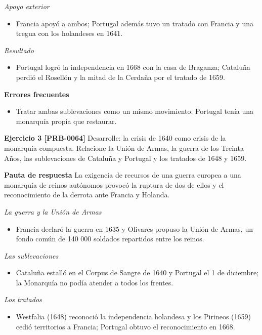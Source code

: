 \documentclass{book}
\begin{document}
\noindent\textit{Apoyo exterior}
\begin{itemize}
\item Francia apoyó a ambos; Portugal además tuvo un tratado con Francia y una tregua con los holandeses en 1641.
\end{itemize}

\noindent\textit{Resultado}
\begin{itemize}
\item Portugal logró la independencia en 1668 con la casa de Braganza; Cataluña perdió el Rosellón y la mitad de la Cerdaña por el tratado de 1659.
\end{itemize}

\noindent\textbf{Errores frecuentes}
\begin{itemize}
\item Tratar ambas sublevaciones como un mismo movimiento: Portugal tenía una monarquía propia que restaurar.
\end{itemize}

\noindent\textbf{Ejercicio 3 [PRB-0064]}
Desarrolle: la crisis de 1640 como crisis de la monarquía compuesta. Relacione la Unión de Armas, la guerra de los Treinta Años, las sublevaciones de Cataluña y Portugal y los tratados de 1648 y 1659.


\noindent\textbf{Pauta de respuesta}
La exigencia de recursos de una guerra europea a una monarquía de reinos autónomos provocó la ruptura de dos de ellos y el reconocimiento de la derrota ante Francia y Holanda.


\noindent\textit{La guerra y la Unión de Armas}
\begin{itemize}
\item Francia declaró la guerra en 1635 y Olivares propuso la Unión de Armas, un fondo común de 140 000 soldados repartidos entre los reinos.
\end{itemize}

\noindent\textit{Las sublevaciones}
\begin{itemize}
\item Cataluña estalló en el Corpus de Sangre de 1640 y Portugal el 1 de diciembre; la Monarquía no podía atender a todos los frentes.
\end{itemize}

\noindent\textit{Los tratados}
\begin{itemize}
\item Westfalia (1648) reconoció la independencia holandesa y los Pirineos (1659) cedió territorios a Francia; Portugal obtuvo el reconocimiento en 1668.
\end{itemize}
\end{document}
